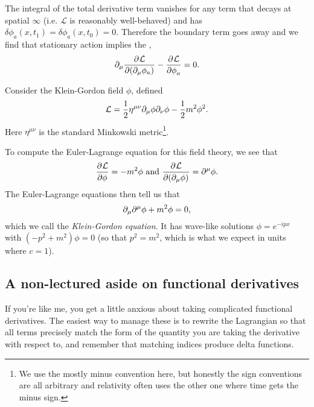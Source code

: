 The integral of the total derivative term vanishes for any term that decays at spatial $\infty$ (i.e. $\mathcal{L}$ is reasonably well-behaved) and has $\delta \phi_a(x,t_1)=\delta \phi_a(x,t_0)=0$. Therefore the boundary term goes away and we find that stationary action implies the ,
$$\partial_\mu\frac{\partial^{} \mathcal{L}}{\partial (\partial_\mu\phi_a) ^{}}-\frac{\partial^{} \mathcal{L}}{\partial \phi_a ^{}}=0.$$

\begin{exm}
Consider the Klein-Gordon field $\phi$, defined
$$\mathcal{L}=\frac{1}{2} \eta^{\mu\nu}\partial_\mu \phi \partial_\nu \phi -\frac{1}{2}m^2 \phi^2.$$
Here $\eta^{\mu\nu}$ is the standard Minkowski metric\footnote{We use the mostly minus convention here, but honestly the sign conventions are all arbitrary and relativity often uses the other one where time gets the minus sign.}.

To compute the Euler-Lagrange equation for this field theory,
 we see that $$\frac{\partial^{} \mathcal L}{\partial \phi ^{}}=-m^2\phi \text{ and } \frac{\partial^{} \mathcal L}{\partial (\partial_\mu \phi) ^{}}=\partial^\mu \phi.$$
The Euler-Lagrange equations then tell us that $$\partial_\mu \partial^\mu \phi+m^2\phi = 0,$$ which we call the \emph{Klein-Gordon equation}. It has wave-like solutions $\phi=e^{-ipx}$ with $(-p^2+m^2)\phi=0$ (so that $p^2=m^2$, which is what we expect in units where $c=1$).
\end{exm}

\subsection*{A non-lectured aside on functional derivatives} If you're like me, you get a little anxious about taking complicated functional derivatives. The easiest way to manage these is to rewrite the Lagrangian so that all terms precisely match the form of the quantity you are taking the derivative with respect to, and remember that matching indices produce delta functions. 


